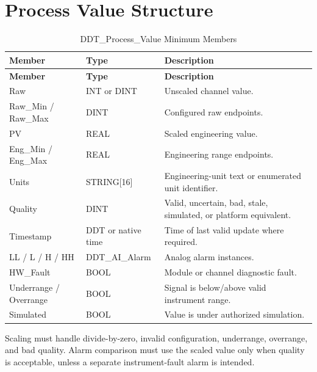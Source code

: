 \section{Process Value Structure}
\begin{longtable}{@{}P{3.61cm}P{3.61cm}P{8.42cm}@{}}
\caption{DDT\_Process\_Value Minimum Members}\label{tab:ddt-process-value}\\
\toprule {}\textbf{Member} & \textbf{Type} & \textbf{Description}\\ \midrule
\endfirsthead
\toprule {}\textbf{Member} & \textbf{Type} & \textbf{Description}\\ \midrule
\endhead
Raw & INT or DINT & Unscaled channel value.\\
Raw\_Min / Raw\_Max & DINT & Configured raw endpoints.\\
PV & REAL & Scaled engineering value.\\
Eng\_Min / Eng\_Max & REAL & Engineering range endpoints.\\
Units & STRING[16] & Engineering-unit text or enumerated unit identifier.\\
Quality & DINT & Valid, uncertain, bad, stale, simulated, or platform equivalent.\\
Timestamp & DDT or native time & Time of last valid update where required.\\
LL / L / H / HH & DDT\_AI\_Alarm & Analog alarm instances.\\
HW\_Fault & BOOL & Module or channel diagnostic fault.\\
Underrange / Overrange & BOOL & Signal is below/above valid instrument range.\\
Simulated & BOOL & Value is under authorized simulation.\\
\bottomrule
\end{longtable}

Scaling must handle divide-by-zero, invalid configuration, underrange, overrange, and bad quality. Alarm comparison must use the scaled value only when quality is acceptable, unless a separate instrument-fault alarm is intended.

